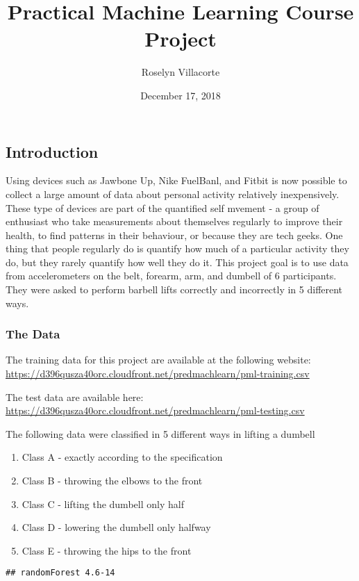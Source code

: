 \documentclass[]{article}
\title{Practical Machine Learning Course Project}
\author{Roselyn Villacorte}
\date{December 17, 2018}
\providecommand{\tightlist}{%
  \setlength{\itemsep}{0pt}\setlength{\parskip}{0pt}}
\begin{document}
\maketitle

\subsection{Introduction}\label{introduction}

Using devices such as Jawbone Up, Nike FuelBanl, and Fitbit is now
possible to collect a large amount of data about personal activity
relatively inexpensively. These type of devices are part of the
quantified self mvement - a group of enthusiast who take measurements
about themselves regularly to improve their health, to find patterns in
their behaviour, or because they are tech geeks. One thing that people
regularly do is quantify how much of a particular activity they do, but
they rarely quantify how well they do it. This project goal is to use
data from accelerometers on the belt, forearm, arm, and dumbell of 6
participants. They were asked to perform barbell lifts correctly and
incorrectly in 5 different ways.

\subsubsection{The Data}\label{the-data}

The training data for this project are available at the following
website:
\url{https://d396qusza40orc.cloudfront.net/predmachlearn/pml-training.csv}

The test data are available here:
\url{https://d396qusza40orc.cloudfront.net/predmachlearn/pml-testing.csv}

The following data were classified in 5 different ways in lifting a
dumbell

\begin{enumerate}
\def\labelenumi{\arabic{enumi}.}
\tightlist
\item
  Class A - exactly according to the specification
\item
  Class B - throwing the elbows to the front
\item
  Class C - lifting the dumbell only half
\item
  Class D - lowering the dumbell only halfway
\item
  Class E - throwing the hips to the front
\end{enumerate}

\begin{verbatim}
## randomForest 4.6-14
\end{verbatim}
\end{document}
